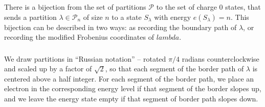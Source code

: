 \documentclass{amsart}[12pt]
\theoremstyle{definition}
\begin{document}
There is a bijection from the set of partitions $\mathcal{P}$ to the
set of charge 0 states, that sends a partition
$\lambda\in\mathcal{P}_n$ of size $n$ to a state $S_\lambda$ with
energy $e(S_\lambda)=n$.  This bijection can be described in two ways:
as recording the boundary path of $\lambda$, or recording the modified
Frobenius coordinates of $lambda$.


\subsubsection{}
We draw partitions in ``Russian
notation'' -- rotated $\pi/4$ radians counterclockwise and scaled up
by a factor of $\sqrt{2}$, so that each segment of the border path of
$\lambda$ is centered above a half integer.  For each segment of the border path, we place an electron in the corresponding energy level if that segment of the border slopes up, and we leave the energy state empty if that segment of border path slopes down.
\end{document}
